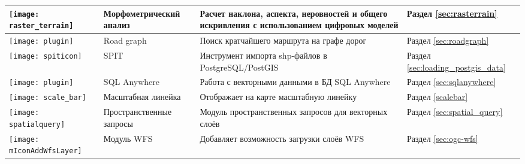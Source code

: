 {\begin{longtable}{|p{1.2cm}|p{3.8cm}|p{7.5cm}|p{3cm}|}
\hline
\texttt{[image: raster\_terrain]}
 & Морфометрический анализ \index{модули!морфометрический анализ} & Расчет наклона, аспекта,
неровностей и общего искривления с использованием цифровых моделей & Раздел \ref{sec:rasterrain}\\
\hline
\texttt{[image: plugin]}
 & Road graph \index{plugins!road graph} & Поиск кратчайшего маршрута на графе дорог & Раздел \ref{sec:roadgraph}\\
\hline
\texttt{[image: spiticon]}
 & SPIT \index{модули!SPIT} & Инструмент импорта shp-файлов в  PostgreSQL/PostGIS & Раздел \ref{sec:loading_postgis_data}\\
\hline
\texttt{[image: plugin]}
 & SQL Anywhere \index{plugins!SQL anywhere} & Работа с векторными данными в БД SQL Anywhere & Раздел \ref{sec:sqlanywhere}\\
 \hline
\texttt{[image: scale\_bar]}
 & Масштабная линейка \index{модули!масштабная линейка}& Отображает на карте масштабную линейку & Раздел \ref{scalebar}\\
\hline
\texttt{[image: spatialquery]}
 & Пространственные запросы & Модуль пространственных запросов для векторных слоёв & Раздел \ref{sec:spatial_query}\\
\hline
\texttt{[image: mIconAddWfsLayer]}
 & Модуль WFS & Добавляет возможность загрузки слоёв WFS & Раздел \ref{sec:ogc-wfs}\\
\hline
\end{longtable}}

\newpage
